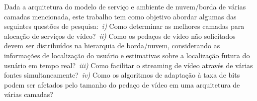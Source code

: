 Dada a arquitetura do modelo de serviço e ambiente de nuvem/borda de várias camadas mencionada, este trabalho tem como objetivo abordar algumas das seguintes questões de pesquisa:~\textit{i)} Como determinar as melhores camadas para alocação de serviços de vídeo?~\textit{ii)} Como os pedaços de vídeo não solicitados devem ser distribuídos na hierarquia de borda/nuvem, considerando as informações de localização do usuário e estimativas sobre a localização futura do usuário em tempo real?~\textit{iii)} Como facilitar o streaming de vídeo através de várias fontes simultaneamente?~\textit{iv)} Como os algoritmos de adaptação à taxa de bits podem ser afetados pelo tamanho do pedaço de vídeo em uma arquitetura de várias camadas?





